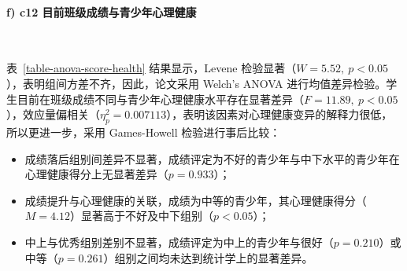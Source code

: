 \documentclass[zihao = -4, linespread = 1.5]{article}
\begin{document}
\paragraph*{f) c12 目前班级成绩与青少年心理健康}~{}

表~\ref{table-anova-score-health} 结果显示，Levene 检验显著（$W=5.52,\ p<0.05$），表明组间方差不齐，因此，论文采用 Welch's ANOVA 进行均值差异检验。学生目前在班级成绩不同与青少年心理健康水平存在显著差异（$F=11.89,\ p<0.05$），效应量偏相关（$\eta^2_p=0.007113$），表明该因素对心理健康变异的解释力很低，所以更进一步，采用 Games-Howell 检验进行事后比较：

\begin{itemize}
    \item 成绩落后组别间差异不显著，成绩评定为不好的青少年与中下水平的青少年在心理健康得分上无显著差异（$p=0.933$）；
    \item 成绩提升与心理健康的关联，成绩为中等的青少年，其心理健康得分（$M=4.12$）显著高于不好及中下组别（$p<0.05$）；
    \item 中上与优秀组别差别不显著，成绩评定为中上的青少年与很好（$p=0.210$）或中等（$p=0.261$）组别之间均未达到统计学上的显著差异。
\end{itemize}
\end{document}
